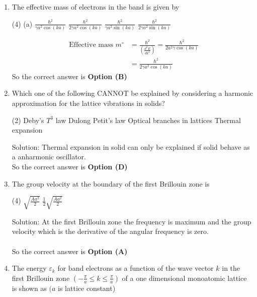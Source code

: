 \begin{enumerate}
	\item The effective mass of electrons in the band is given by
	{	}
	\begin{tasks}(4)
		\task[\textbf{A.}] (a) $\frac{\hbar^{2}}{\gamma a^{2} \cos (k a)}$
		\task[\textbf{B.}] $\frac{\hbar^{2}}{2 \gamma a^{2} \cos (k a)}$
		\task[\textbf{C.}] $\frac{\hbar^{2}}{\gamma a^{2} \sin (k a)}$
		\task[\textbf{D.}] $\frac{\hbar^{2}}{2 \gamma a^{2} \sin (k a)}$
	\end{tasks}
	\begin{answer}
		\begin{align*}
		\text{	Effective mass }m^{\circ}&=\frac{\hbar^{2}}{\left(\frac{d^{2} E}{d k^{2}}\right)}=\frac{\hbar^{2}}{2 a^{2} \gamma \cos (k a)}\\&=\frac{\hbar^{2}}{2 \gamma a^{2} \cos (k a)}
		\end{align*}
		So the correct answer is \textbf{Option (B)}
	\end{answer}
	\item Which one of the following CANNOT be explained by considering a harmonic approximation for the lattice vibrations in solids?
	{	}
	\begin{tasks}(2)
		\task[\textbf{A.}] Deby's $T^{3}$ law
		\task[\textbf{B.}] Dulong Petit's law
		\task[\textbf{C.}] Optical branches in lattices
		\task[\textbf{D.}]  Thermal expansion
	\end{tasks}
	\begin{answer}
		Solution: Thermal expansion in solid can only be explained if solid behave as a anharmonic oscillator.\\
		So the correct answer is \textbf{Option (D)}
	\end{answer}
	\item The group velocity at the boundary of the first Brillouin zone is
	{	}
	\begin{tasks}(4)
		\task[\textbf{C.}] $\sqrt{\frac{A a^{2}}{2}}$
		\task[\textbf{D.}] $\frac{1}{2} \sqrt{\frac{A a^{2}}{2}}$
	\end{tasks}
	\begin{answer}
		Solution: At the first Brillouin zone the frequency is maximum and the group velocity which is the derivative of the angular frequency is zero.\\\\
		So the correct answer is \textbf{Option (A)}
	\end{answer}
	\item The energy $\varepsilon_{k}$ for band electrons as a function of the wave vector $k$ in the first Brillouin zone $\left(-\frac{\pi}{a} \leq k \leq \frac{\pi}{a}\right)$ of a one dimensional monoatomic lattice is shown as $(a$ is lattice constant)\\

\end{enumerate}
